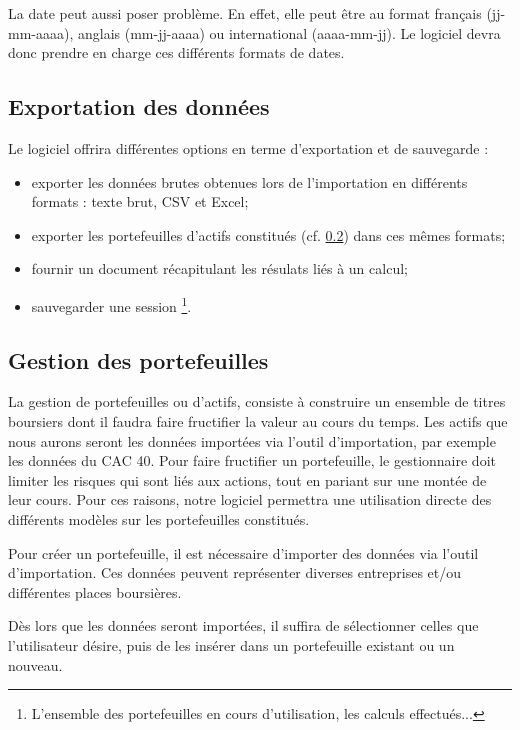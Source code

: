 		La date peut aussi poser problème. En effet, elle peut être au format français (jj-mm-aaaa), anglais (mm-jj-aaaa) ou international (aaaa-mm-jj). Le logiciel devra donc prendre en charge ces différents formats de dates.


	\subsection{Exportation des données}
		Le logiciel offrira différentes options en terme d'exportation et de sauvegarde :
		\begin{itemize}
			\item exporter les données brutes obtenues lors de l'importation en différents formats : texte brut, CSV et Excel;
			\item exporter les portefeuilles d'actifs constitués (cf. \ref{subsubsection:portefeuilles}) dans ces mêmes formats;
			\item fournir un document récapitulant les résulats liés à un calcul;
			\item sauvegarder une session \footnote{L'ensemble des portefeuilles en cours d'utilisation, les calculs effectués...}.
		\end{itemize}


	\subsection{Gestion des portefeuilles}
	\label{subsubsection:portefeuilles}

		La gestion de portefeuilles ou d'actifs, consiste à construire un ensemble de titres boursiers dont il faudra faire fructifier la valeur au cours du temps. Les actifs que nous aurons seront les données importées via l'outil d'importation, par exemple les données du CAC 40.
		Pour faire fructifier un portefeuille, le gestionnaire doit limiter les risques qui sont liés aux actions, tout en pariant sur une montée de leur cours. Pour ces raisons, notre logiciel permettra une utilisation directe des différents modèles sur les portefeuilles constitués.


		Pour créer un portefeuille, il est nécessaire d'importer des données via l'outil d'importation. Ces données peuvent représenter diverses entreprises et/ou différentes places boursières. 

		Dès lors que les données seront importées, il suffira de sélectionner celles que l'utilisateur désire, puis de les insérer dans un portefeuille existant ou un nouveau.


